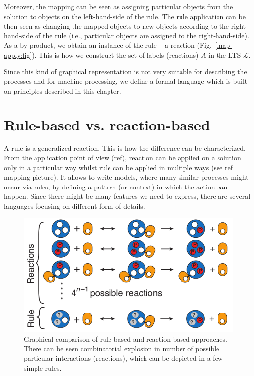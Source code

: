 \documentclass[12pt]{fithesis2}
\begin{document}
Moreover, the mapping can be seen as assigning particular objects from the solution to objects on the left-hand-side of the rule. The rule application can be then seen as changing the mapped objects to new objects according to the right-hand-side of the rule (i.e., particular objects are assigned to the right-hand-side). As a by-product, we obtain an instance of the rule -- a reaction (Fig.~\ref{map-apply:fig}). This is how we construct the set of labels (reactions) $A$ in the LTS $\mathcal{L}$.

Since this kind of graphical representation is not very suitable for describing the processes and for machine processing, we define a formal language which is built on principles described in this chapter.

\section{Rule-based vs. reaction-based}

A rule is a generalized reaction. This is how the difference can be characterized. From the application point of view (ref), reaction can be applied on a solution only in a particular way whilst rule can be applied in multiple ways (see ref mapping picture). It allows to write models, where many similar processes might occur via rules, by defining a pattern (or context) in which the action can happen. Since there might be many features we need to express, there are several languages focusing on different form of details.  

\begin{figure}[!h]
\begin{center}
\includegraphics[scale=0.5]{pics/reaction_vs_rule}
\end{center}
\caption{Graphical comparison of rule-based and reaction-based approaches. There can be seen combinatorial explosion in number of possible particular interactions (reactions), which can be depicted in a few simple rules.}
\end{figure}
\end{document}
